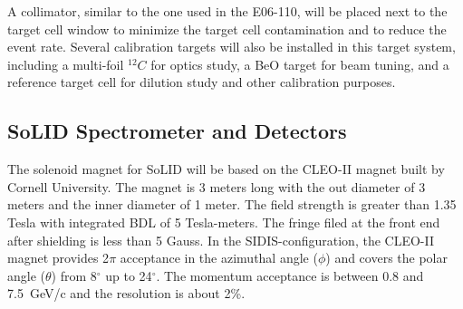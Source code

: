 A collimator, similar to the one used in the E06-110, will be placed next to the target cell window to minimize the target cell contamination and to reduce the event rate. Several calibration targets will also be installed in this target system, including a multi-foil $^{12}C$ for optics study, a BeO target for beam tuning, and a reference target cell for dilution study and other calibration purposes.
  
\subsection {SoLID Spectrometer and Detectors} 
The solenoid magnet for SoLID will be based on the CLEO-II magnet built by Cornell University. The magnet is 3 meters long with the out diameter of 3 meters and the inner diameter of 1 meter. The field strength is greater than 1.35 Tesla with integrated BDL of 5 Tesla-meters. The fringe filed at the front end after shielding is less than 5 Gauss. In the SIDIS-configuration, the CLEO-II magnet provides 2$\pi$ acceptance in the azimuthal angle ($\phi$) and covers the polar angle ($\theta$) from 8$^{\circ}$ up to 24$^{\circ}$. The momentum acceptance is between 0.8 and 7.5~GeV/c and the resolution is about 2\%. 

